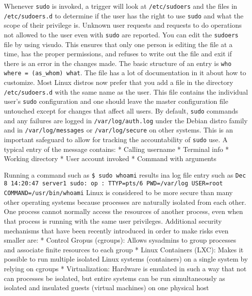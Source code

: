 Whenever \texttt{sudo} is invoked, a trigger will look at
\texttt{/etc/sudoers} and the files in \texttt{/etc/sudoers.d} to
determine if the user has the right to use \texttt{sudo} and what the
scope of their privilege is. Unknown user requests and requests to do
operations not allowed to the user even with \texttt{sudo} are reported.
You can edit the \texttt{sudoers} file by using visudo. This ensures
that only one person is editing the file at a time, has the proper
permissions, and refuses to write out the file and exit if there is an
error in the changes made. The basic structure of an entry is
\texttt{who where = (as\_whom) what}. The file has a lot of
documentation in it about how to customize. Most Linux distros now
prefer that you add a file in the directory \texttt{/etc/sudoers.d} with
the same name as the user. This file contains the individual user's
\texttt{sudo} configuration and one should leave the master
configuration file untouched except for changes that affect all users.
By default, \texttt{sudo} commands and any failures are logged in
\texttt{/var/log/auth.log} under the Debian distro family and in
\texttt{/var/log/messages} or \texttt{/var/log/secure} on other systems.
This is an important safeguard to allow for tracking the accountability
of \texttt{sudo} use. A typical entry of the message contains: * Calling
username * Terminal info * Working directory * User account invoked *
Command with arguments

Running a command such as \texttt{\$ sudo whoami} results ina log file
entry such as
\texttt{Dec 8 14:20:47 server1 sudo: op : TTYP=pts/6 PWD=/var/log USER=root COMMAND=/usr/bin/whoami}
Linux is considered to be more secure than many other operating systems
because processes are naturally isolated from each other. One process
cannot normally access the resources of another process, even when that
process is running with the same user privileges. Additional security
mechanisms that have been recently introduced in order to make risks
even smaller are: * Control Gropus (cgroups): Allows sysadmins to group
processes and associate finite resources to each group * Linux
Containers (LXC): Makes it possible to run multiple isolated Linux
systems (containers) on a single system by relying on cgroups *
Virtualization: Hardware is emulated in such a way that not can
processes be isolated, but entire systems can be run simultaneously as
isolated and insulated guests (virtual machines) on one physical host

